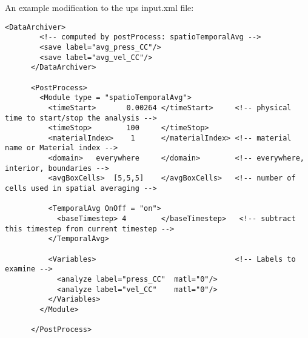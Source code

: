 An example modification to the ups input.xml file:
\begin{Verbatim}[fontsize=\footnotesize]
      <DataArchiver> 
        <!-- computed by postProcess: spatioTemporalAvg -->
        <save label="avg_press_CC"/>    
        <save label="avg_vel_CC"/>  
      </DataArchiver>

      <PostProcess>
        <Module type = "spatioTemporalAvg">
          <timeStart>       0.00264 </timeStart>     <!-- physical time to start/stop the analysis --> 
          <timeStop>        100     </timeStop>
          <materialIndex>    1      </materialIndex> <!-- material name or Material index -->
          <domain>   everywhere     </domain>        <!-- everywhere, interior, boundaries -->
          <avgBoxCells>  [5,5,5]    </avgBoxCells>   <!-- number of cells used in spatial averaging -->

          <TemporalAvg OnOff = "on">
            <baseTimestep> 4        </baseTimestep>   <!-- subtract this timestep from current timestep -->
          </TemporalAvg>

          <Variables>                                <!-- Labels to examine -->
            <analyze label="press_CC"  matl="0"/>
            <analyze label="vel_CC"    matl="0"/>
          </Variables>
        </Module>

      </PostProcess>
\end{Verbatim}

